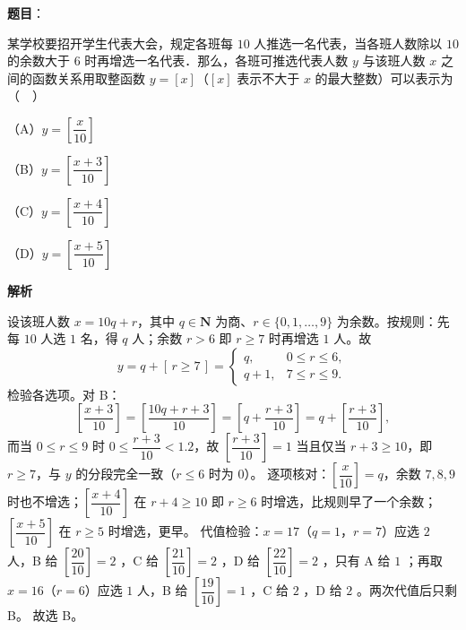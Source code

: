 \begin{answer}

\textbf{题目}：

某学校要招开学生代表大会，规定各班每 $10$ 人推选一名代表，当各班人数除以 $10$ 的余数大于 $6$ 时再增选一名代表．那么，各班可推选代表人数 $y$ 与该班人数 $x$ 之间的函数关系用取整函数 $y=[x]$（$[x]$ 表示不大于 $x$ 的最大整数）可以表示为（　）

（A）$y=\left[\dfrac{x}{10}\right]$

（B）$y=\left[\dfrac{x+3}{10}\right]$

（C）$y=\left[\dfrac{x+4}{10}\right]$

（D）$y=\left[\dfrac{x+5}{10}\right]$

\textbf{解析}

设该班人数 $x=10q+r$，其中 $q\in\mathbf N$ 为商、$r\in\{0,1,\dots,9\}$ 为余数。按规则：先每 $10$ 人选 $1$ 名，得 $q$ 人；余数 $r>6$ 即 $r\geqslant 7$ 时再增选 $1$ 人。故
\nopagebreak[4]
\[y=q+[\,r\geqslant 7\,]=\begin{cases}q,&0\leqslant r\leqslant 6,\\ q+1,&7\leqslant r\leqslant 9.\end{cases}\]
检验各选项。对 B：
\nopagebreak[4]
\[\left[\frac{x+3}{10}\right]=\left[\frac{10q+r+3}{10}\right]=\left[q+\frac{r+3}{10}\right]=q+\left[\frac{r+3}{10}\right],\]
而当 $0\leqslant r\leqslant 9$ 时 $0\leqslant\dfrac{r+3}{10}<1.2$，故 $\left[\dfrac{r+3}{10}\right]=1$ 当且仅当 $r+3\geqslant 10$，即 $r\geqslant 7$，与 $y$ 的分段完全一致（$r\leqslant 6$ 时为 $0$）。
逐项核对：$\left[\dfrac x{10}\right]=q$，余数 $7,8,9$ 时也不增选；$\left[\dfrac{x+4}{10}\right]$ 在 $r+4\geqslant 10$ 即 $r\geqslant 6$ 时增选，比规则早了一个余数；$\left[\dfrac{x+5}{10}\right]$ 在 $r\geqslant 5$ 时增选，更早。
代值检验：$x=17$（$q=1$，$r=7$）应选 $2$ 人，B 给 $\left[\dfrac{20}{10}\right]=2$ ，C 给 $\left[\dfrac{21}{10}\right]=2$ ，D 给 $\left[\dfrac{22}{10}\right]=2$ ，只有 A 给 $1$ ；再取 $x=16$（$r=6$）应选 $1$ 人，B 给 $\left[\dfrac{19}{10}\right]=1$ ，C 给 $2$ ，D 给 $2$ 。两次代值后只剩 B。
故选 B。


\end{answer}
